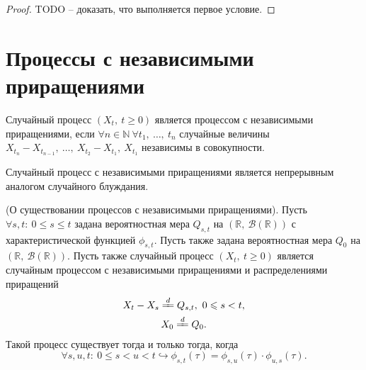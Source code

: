 \begin{proof}
TODO -- доказать, что выполняется первое условие.
\end{proof}
\section{Процессы с независимыми приращениями}
\begin{definition}
Случайный процесс $\displaystyle ( X_{t} ,\ t\geqslant 0)$ является процессом с независимыми приращениями, если $\displaystyle \forall n\in \mathbb{N} \ \forall t_{1} ,\ \dotsc ,\ t_{n}$ случайные величины $\displaystyle X_{t_{n}} -X_{t_{n-1}} ,\ \dotsc ,\ X_{t_{2}} -X_{t_{1}} ,\ X_{t_{1}}$ независимы в совокупности.
\end{definition}
\begin{note}
Случайный процесс с независимыми приращениями является непрерывным аналогом случайного блуждания.
\end{note}
\begin{theorem}
(О существовании процессов с независимыми приращениями). Пусть $\displaystyle \forall s,t:\ 0\leqslant s\leqslant t$ задана вероятностная мера $\displaystyle Q_{s,t}$ на $\displaystyle (\mathbb{R} ,\ \mathcal{B}(\mathbb{R}))$ с характеристической функцией $\displaystyle \phi _{s,t}$. Пусть также задана вероятностная мера $\displaystyle Q_{0}$ на $\displaystyle (\mathbb{R} ,\ \mathcal{B}(\mathbb{R}))$. Пусть также случайный процесс $\displaystyle ( X_{t} ,\ t\geqslant 0)$ является случайным процессом с независимыми приращениями и распределениями приращений
\begin{gather*}
X_{t} -X_{s}\xlongequal{d} Q_{s,t} ,\ 0\leqslant s< t,\\
X_{0}\xlongequal{d} Q_{0} .
\end{gather*}
Такой процесс существует тогда и только тогда, когда
\begin{equation}
\forall s,u,t:\ 0\leqslant s< u< t\hookrightarrow \phi _{s,t}( \tau ) =\phi _{s,u}( \tau ) \cdotp \phi _{u,s}( \tau ) .
\end{equation}
\end{theorem}

